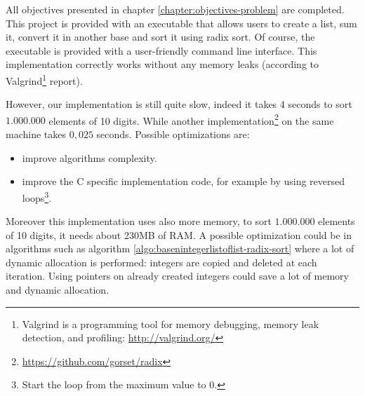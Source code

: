 \documentclass[book, nodocumentinfo]{upmethodology-document}
\begin{document}
All objectives presented in chapter \ref{chapter:objectives-problem} are completed.
This project is provided with an executable that allows users to create a list,
sum it, convert it in another base and sort it using radix sort.
Of course, the executable is provided with a user-friendly command line interface.
This implementation correctly works without any memory leaks
(according to Valgrind\footnote{Valgrind is a programming tool for memory debugging, memory leak detection, and profiling: \url{http://valgrind.org/}} report).

However, our implementation is still quite slow, indeed it takes 4 seconds to sort \(1.000.000\) elements of 10 digits.
While another implementation\footnote{\url{https://github.com/gorset/radix}} on the same machine takes \(0,025\) seconds.
Possible optimizations are:
\begin{itemize}
    \item improve algorithms complexity.
    \item improve the C specific implementation code, for example by using reversed loops\footnote{Start the loop from the maximum value to 0.}.
\end{itemize}

Moreover this implementation uses also more memory, to sort \(1.000.000\) elements of 10 digits, it needs about 230MB of RAM.
A possible optimization could be in algorithms such as algorithm \ref{algo:basenintegerlistoflist-radix-sort}
where a lot of dynamic allocation is performed: integers are copied and deleted at each iteration.
Using pointers on already created integers could save a lot of memory and dynamic allocation.
\end{document}
